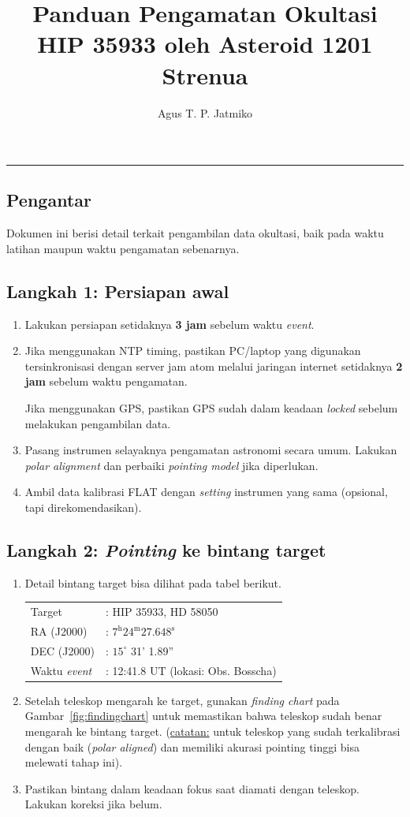 \documentclass[12pt,a4paper]{article}
\title{\textbf{Panduan Pengamatan Okultasi HIP 35933 oleh Asteroid 1201 Strenua}}
\author{Agus T. P. Jatmiko}
\begin{document}
\maketitle
\noindent\rule{\linewidth}{0.4pt}

\subsection*{Pengantar}
Dokumen ini berisi detail terkait pengambilan data okultasi, baik pada waktu latihan maupun waktu pengamatan sebenarnya.
\subsection*{Langkah 1: Persiapan awal}
\begin{enumerate}
	\item Lakukan persiapan setidaknya \textbf{3 jam} sebelum waktu \textit{event}.
	\item Jika menggunakan NTP timing, pastikan PC/laptop yang digunakan tersinkronisasi dengan server jam atom melalui jaringan internet setidaknya \textbf{2 jam} sebelum waktu pengamatan.
	
	Jika menggunakan GPS, pastikan GPS sudah dalam keadaan \textit{locked} sebelum melakukan pengambilan data.
	\item Pasang instrumen selayaknya pengamatan astronomi secara umum. Lakukan \textit{polar alignment} dan perbaiki \textit{pointing model} jika diperlukan.
	\item Ambil data kalibrasi FLAT dengan \textit{setting} instrumen yang sama (opsional, tapi direkomendasikan).  
\end{enumerate}
\subsection*{Langkah 2: \textit{Pointing} ke bintang target}
\begin{enumerate}
	\item Detail bintang target bisa dilihat pada tabel berikut.
	\begin{table}[H]
		\centering
		\large
		\begin{tabular}{ll}
			\toprule
			Target &: HIP 35933, HD 58050  \\
			RA (J2000) &: $7^\mathrm{h} 24^\mathrm{m} 27.648^\mathrm{s}$  \\
			DEC (J2000) &: $15^\circ$ 31' 1.89''  \\
			Waktu \textit{event} &: 12:41.8 UT (lokasi: Obs. Bosscha) \\
			\bottomrule
		\end{tabular}
	\end{table}
	\item Setelah teleskop mengarah ke target, gunakan \textit{finding chart} pada Gambar~\ref{fig:findingchart} untuk memastikan bahwa teleskop sudah benar mengarah ke bintang target. (\underline{catatan:} untuk teleskop yang sudah terkalibrasi dengan baik (\textit{polar aligned}) dan memiliki akurasi pointing tinggi bisa melewati tahap ini).
	\item Pastikan bintang dalam keadaan fokus saat diamati dengan teleskop. Lakukan koreksi jika belum.
\end{enumerate}
\end{document}

